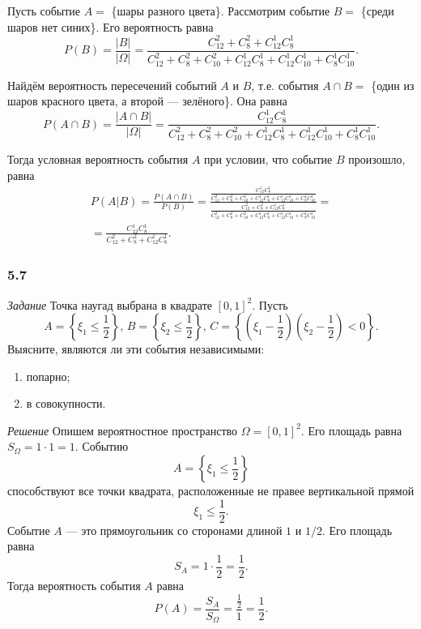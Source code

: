 Пусть событие $A =$ \{шары разного цвета\}.
Рассмотрим событие $B =$ \{среди шаров нет синих\}.
Его вероятность равна
$$P \left( B \right) =
\frac{ \left| B \right| }{ \left| \Omega \right| } =
\frac{C_{12}^2 + C_8^2 + C_{12}^1 C_8^1}{C_{12}^2 + C_8^2 + C_{10}^2 + C_{12}^1 C_8^1 + C_{12}^1 C_{10}^1 + C_8^1 C_{10}^1}.$$

Найдём вероятность пересечений событий $A$ и $B$, т.е. события $A \cap B =$ \{один из шаров красного цвета, а второй --- зелёного\}.
Она равна
$$P \left( A \cap B \right) =
\frac{ \left| A \cap B \right| }{ \left| \Omega \right| } =
\frac{C_{12}^1 C_8^1}{C_{12}^2 + C_8^2 + C_{10}^2 + C_{12}^1 C_8^1 + C_{12}^1 C_{10}^1 + C_8^1 C_{10}^1}.$$

Тогда условная вероятность события $A$ при условии, что событие $B$ произошло, равна
\begin{equation*}
\begin{split}
P \left( \left. A \right| B \right) =
\frac{P \left( A \cap B \right) }{P \left( B \right) } =
\frac{ \frac{C_{12}^1 C_8^1}{C_{12}^2 + C_8^2 + C_{10}^2 + C_{12}^1 C_8^1 + C_{12}^1 C_{10}^1 + C_8^1 C_{10}^1} }
{ \frac{C_{12}^2 + C_8^2 + C_{12}^1 C_8^1}{C_{12}^2 + C_8^2 + C_{10}^2 + C_{12}^1 C_8^1 + C_{12}^1 C_{10}^1 + C_8^1 C_{10}^1} } = \\
= \frac{C_{12}^1 C_8^1}{C_{12}^2 + C_8^2 + C_{12}^1 C_8^1}.
\end{split}
\end{equation*}

\subsubsection*{5.7}

\textit{Задание} Точка наугад выбрана в квадрате $ \left[ 0,1 \right]^2$.
Пусть
$$A =
\left\{ \xi_1 \leq \frac{1}{2} \right\}, \,
B =
\left\{ \xi_2 \leq \frac{1}{2} \right\}, \,
C =
\left\{ \left( \xi_1 - \frac{1}{2} \right) \left( \xi_2 - \frac{1}{2} \right) < 0 \right\}.$$
Выясните, являются ли эти события независимыми:
\begin{enumerate}[label=\alph*)]
\item попарно;
\item в совокупности.
\end{enumerate}

\textit{Решение} Опишем вероятностное пространство $ \Omega = \left[ 0,1 \right]^2$.
Его площадь равна $S_{ \Omega } = 1 \cdot 1 = 1$.
Событию
$$A =
\left\{ \xi_1 \leq \frac{1}{2} \right\} $$
способствуют все точки квадрата, расположенные не правее вертикальной прямой
$$ \xi_1 \leq \frac{1}{2}.$$
Событие $A$ --- это прямоугольник со сторонами длиной $1$ и $1/2$.
Его площадь равна
$$S_A =
1 \cdot \frac{1}{2} =
\frac{1}{2}.$$
Тогда вероятность события $A$ равна
$$P \left( A \right) =
\frac{S_A}{S_{ \Omega }} =
\frac{ \frac{1}{2} }{1} =
\frac{1}{2}.$$

